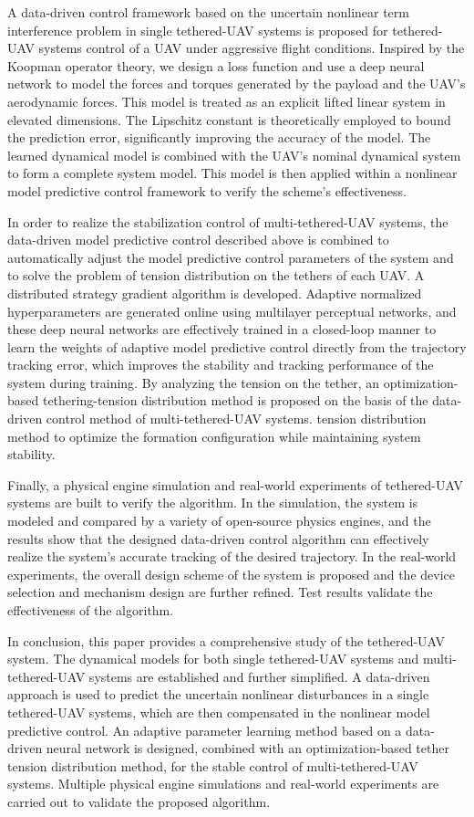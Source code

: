 \documentclass[lang=chs, degree=master, blindreview=false, winfonts=true]{yanputhesis}
\begin{document}
\begin{engabstract}
	A data-driven control framework based on the uncertain nonlinear term interference problem in single tethered-UAV systems is proposed for tethered-UAV systems control of a UAV under aggressive flight conditions. Inspired by the Koopman operator theory, we design a loss function and use a deep neural network to model the forces and torques generated by the payload and the UAV's aerodynamic forces. This model is treated as an explicit lifted linear system in elevated dimensions. The Lipschitz constant is theoretically employed to bound the prediction error, significantly improving the accuracy of the model. The learned dynamical model is combined with the UAV's nominal dynamical system to form a complete system model. This model is then applied within a nonlinear model predictive control framework to verify the scheme's effectiveness.
	
	In order to realize the stabilization control of multi-tethered-UAV systems, the data-driven model predictive control described above is combined to automatically adjust the model predictive control parameters of the system and to solve the problem of tension distribution on the tethers of each UAV. A distributed strategy gradient algorithm is developed. Adaptive normalized hyperparameters are generated online using multilayer perceptual networks, and these deep neural networks are effectively trained in a closed-loop manner to learn the weights of adaptive model predictive control directly from the trajectory tracking error, which improves the stability and tracking performance of the system during training. By analyzing the tension on the tether, an optimization-based tethering-tension distribution method is proposed on the basis of the data-driven control method of multi-tethered-UAV systems. tension distribution method to optimize the formation configuration while maintaining system stability.
	
	Finally, a physical engine simulation and real-world experiments of tethered-UAV systems are built to verify the algorithm. In the simulation, the system is modeled and compared by a variety of open-source physics engines, and the results show that the designed data-driven control algorithm can effectively realize the system's accurate tracking of the desired trajectory. In the real-world experiments, the overall design scheme of the system is proposed and the device selection and mechanism design are further refined. Test results validate the effectiveness of the algorithm.
	
	In conclusion, this paper provides a comprehensive study of the tethered-UAV system. The dynamical models for both single tethered-UAV systems and multi-tethered-UAV systems are established and further simplified. A data-driven approach is used to predict the uncertain nonlinear disturbances in a single tethered-UAV systems, which are then compensated in the nonlinear model predictive control. An adaptive parameter learning method based on a data-driven neural network is designed, combined with an optimization-based tether tension distribution method, for the stable control of multi-tethered-UAV systems. Multiple physical engine simulations and real-world experiments are carried out to validate the proposed algorithm.
	

\end{engabstract}
\end{document}
